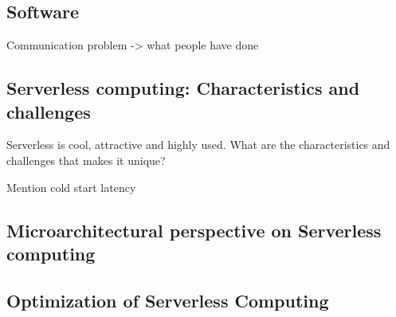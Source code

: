 \documentclass[../main.tex]{subfiles}
\begin{document}
\begin{refsection}
\section{Software}

Communication problem -> what people have done

\subsection{Serverless computing: Characteristics and challenges}
Serverless is cool, attractive and highly used. What are the characteristics and challenges that makes it unique?

Mention cold start latency

\subsection{Microarchitectural perspective on Serverless computing}


\subsection{Optimization of Serverless Computing}



\ifx\chapincluded\undefined
  \printbibliography
  \end{refsection}
 \fi
\end{document}
